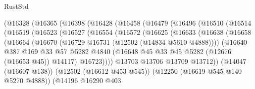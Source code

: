 \begin{lexlean}{RustStd}
\begin{coremodule}
                (@16328
                  (@16365
                    (@16398
                      (@16428
                        (@16458
                          (@16479
                            (@16496
                              (@16510
                                (@16514
                                  (@16519
                                    (@16523
                                      (@16527
                                        (@16554
                                          (@16572
                                            (@16625
                                              (@16633
                                                (@16638
                                                  (@16658
                                                    (@16664
                                                      (@16670
                                                        (@16729
                                                          @16731
                                                          (@12502 (@14834 @5610 @4888))))
                                                      (@16640
                                                        @387
                                                        @169
                                                        @33
                                                        @57
                                                        @5282
                                                        @4840
                                                        (@16648
                                                          @45
                                                          @33
                                                          @45
                                                          @5282
                                                          (@12676 (@16653 @45))
                                                          @14117)
                                                        @16723))))
                                                @13703
                                                @13706
                                                @13709
                                                @13712))
                                            (@14047 (@16607 @138))
                                            (@12502 (@16612 @453 @545))
                                            (@12250 (@16619 @545 @140 @5270 @4888))
                                            (@14196
                                              @16290
                                              @403

\end{coremodule}
\end{lexlean}
